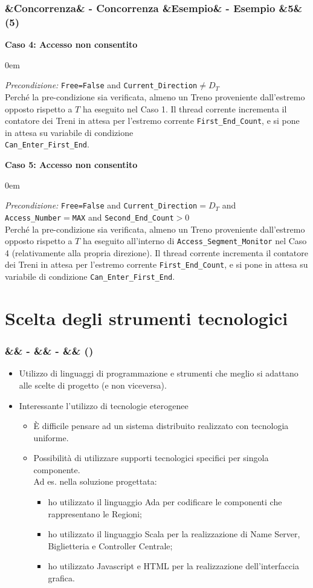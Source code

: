 \documentclass[slidestop,compress,blackandwhite]{beamer}
\newcommand{\ttt}[1]{\texttt{#1}}
\newcommand{\ii}[1]{\textit{#1}}
\newcommand{\describe}[2]{
	\textbf{#1}\\
	\begin{addmargin}[2em]{0em}
		#2
	\end{addmargin}
}
\newcommand{\newtitle}[4]{
	#1 
	\ifx&#2&%
	\else
  		\large- #2
	\fi
	\ifx&#3&%
	\else
  		\normalsize- #3
	\fi
	\ifx&#4&%
	\else
  		\normalsize (#4)
	\fi
}
\newcommand{\newframe}[5]{
	\begin{frame}
		\frametitle{\newtitle{#1}{#2}{#3}{#4}}
		#5
	\end{frame}
}
\newcommand{\myitemize}[1]{
	\begin{itemize}\itemsep4pt
	#1
	\end{itemize}
}
\begin{document}
	
	\newframe{}{Concorrenza}{Esempio}{5}{
		
		\describe{\footnotesize Caso 4: Accesso non consentito}{
			\footnotesize
			\justifying
			\ii{Precondizione:} \ttt{Free=False} and \ttt{Current\_Direction}$\ne D_T$\\
			Perché la pre-condizione sia verificata, almeno un Treno proveniente dall'estremo opposto rispetto a $T$ ha eseguito nel Caso 1. Il thread corrente incrementa il contatore dei Treni in attesa per l'estremo corrente \ttt{First\_End\_Count}, e si pone in attesa su variabile di condizione \\\ttt{Can\_Enter\_First\_End}. 
			
		}
		\describe{\footnotesize Caso 5: Accesso non consentito}{
			\footnotesize
			\justifying
			\ii{Precondizione:} \ttt{Free=False} and \ttt{Current\_Direction}$= D_T$ and \\\ttt{Access\_Number}$=$\ttt{MAX} and \ttt{Second\_End\_Count}$>0$\\
			Perché la pre-condizione sia verificata, almeno un Treno proveniente dall'estremo opposto rispetto a $T$ ha eseguito all'interno di \ttt{Access\_Segment\_Monitor} nel Caso 4 (relativamente alla propria direzione). Il thread corrente incrementa il contatore dei Treni in attesa per l'estremo corrente \ttt{First\_End\_Count}, e si pone in attesa su variabile di condizione \ttt{Can\_Enter\_First\_End}. 
			
		}
	}
	
\section{Scelta degli strumenti tecnologici}\label{tec}
	
	\newframe{}{}{}{}{
		\myitemize {
			\item Utilizzo di linguaggi di programmazione e strumenti che meglio si adattano alle scelte di progetto (e non viceversa).
			\item Interessante l'utilizzo di tecnologie eterogenee
				\myitemize {
					\item \`E difficile pensare ad un sistema distribuito realizzato con tecnologia uniforme.
					\item Possibilità di utilizzare supporti tecnologici specifici per singola componente.\\Ad es. nella soluzione progettata:
					
						\myitemize {
							\item ho utilizzato il linguaggio Ada per codificare le componenti che rappresentano le Regioni;
							\item ho utilizzato il linguaggio Scala per la realizzazione di Name Server, Biglietteria e Controller Centrale;
							\item ho utilizzato Javascript e HTML per la realizzazione dell'interfaccia grafica.
						}
				}
		}
	}
\end{document}
